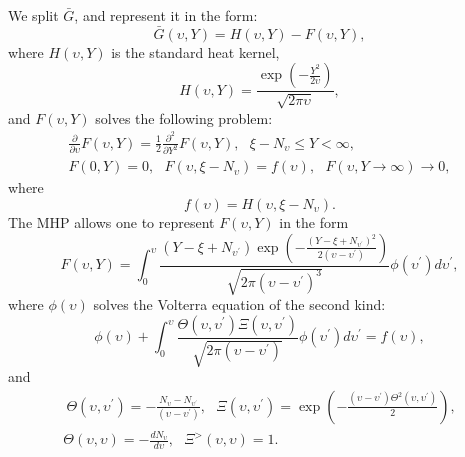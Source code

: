 \documentclass{article}
\begin{document}
We split $\bar{G}$, and represent it in the form:%
\begin{equation}
\bar{G}\left( \upsilon ,Y\right) =H\left( \upsilon ,Y\right) -F\left(
\upsilon ,Y\right) ,  \label{Eq58}
\end{equation}%
where $H\left( \upsilon ,Y\right) $ is the standard heat kernel,%
\begin{equation}
H\left( \upsilon ,Y\right) =\frac{\exp \left( -\frac{Y^{2}}{2\upsilon }%
\right) }{\sqrt{2\pi \upsilon }},  \label{Eq59}
\end{equation}%
and $F\left( \upsilon ,Y\right) $ solves the following problem:%
\begin{equation}
\begin{array}{c}
\frac{\partial }{\partial \upsilon }F\left( \upsilon ,Y\right) =\frac{1}{2}%
\frac{\partial ^{2}}{\partial Y^{2}}F\left( \upsilon ,Y\right) ,\ \ \ \xi
-N_{\upsilon }\leq Y<\infty , \\ 
F\left( 0,Y\right) =0,\ \ \ F\left( \upsilon ,\xi -N_{\upsilon }\right)
=f\left( \upsilon \right) ,\ \ \ F\left( \upsilon ,Y\rightarrow \infty
\right) \rightarrow 0,%
\end{array}
\label{Eq60}
\end{equation}%
where%
\begin{equation}
f\left( \upsilon \right) =H\left( \upsilon ,\xi -N_{\upsilon }\right) .
\label{Eq61}
\end{equation}%
The MHP allows one to represent $F\left( \upsilon ,Y\right) $ in the form%
\begin{equation}
F\left( \upsilon ,Y\right) =\int_{0}^{\upsilon }\frac{\left( Y-\xi
+N_{\upsilon ^{\prime }}\right) \exp \left( -\frac{\left( Y-\xi +N_{\upsilon
^{\prime }}\right) ^{2}}{2\left( \upsilon -\upsilon ^{\prime }\right) }%
\right) }{\sqrt{2\pi \left( \upsilon -\upsilon ^{\prime }\right) ^{3}}}\phi
\left( \upsilon ^{\prime }\right) d\upsilon ^{\prime },  \label{Eq62}
\end{equation}%
where $\phi \left( \upsilon \right) $ solves the Volterra equation of the
second kind:%
\begin{equation}
\phi \left( \upsilon \right) +\int_{0}^{\upsilon }\frac{\Theta \left(
\upsilon ,\upsilon ^{\prime }\right) \Xi \left( \upsilon ,\upsilon ^{\prime
}\right) }{\sqrt{2\pi \left( \upsilon -\upsilon ^{\prime }\right) }}\phi
\left( \upsilon ^{\prime }\right) d\upsilon ^{\prime }=f\left( \upsilon
\right) ,  \label{Eq63}
\end{equation}%
and%
\begin{equation}
\begin{array}{c}
\ \Theta \left( \upsilon ,\upsilon ^{\prime }\right) =-\frac{N_{\upsilon
}-N_{\upsilon ^{\prime }}}{\left( \upsilon -\upsilon ^{\prime }\right) },\ \
\ \Xi \left( \upsilon ,\upsilon ^{\prime }\right) =\exp \left( -\frac{\left(
\upsilon -\upsilon ^{\prime }\right) \Theta ^{2}\left( \upsilon ,\upsilon
^{\prime }\right) }{2}\right) , \\ 
\Theta \left( \upsilon ,\upsilon \right) =-\frac{dN_{\upsilon }}{d\upsilon }%
,\ \ \ \Xi ^{>}\left( \upsilon ,\upsilon \right) =1.%
\end{array}
\label{Eq64}
\end{equation}%
\end{document}
